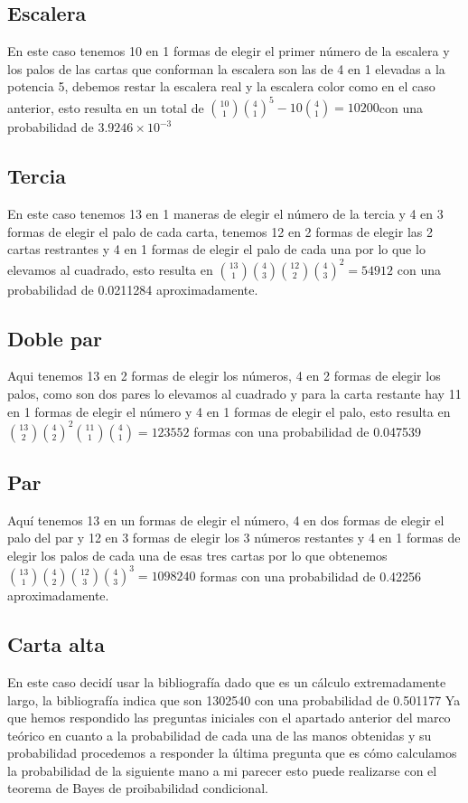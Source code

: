\documentclass[letterpaper,11pt,dvipsnames]{article}
\begin{document}
\subsection{Escalera}
En este caso tenemos 10 en 1 formas de elegir el primer número de la escalera y los palos de las cartas que conforman la escalera son las de 4 en 1 elevadas a la potencia 5, debemos restar la escalera real y la escalera color  como en el caso anterior, esto resulta en un total de \({{10}\choose{1}}{{4}\choose{1}}^{5}-10{{4}\choose{1}}=10200\)con una probabilidad de \(3.9246 \times 10^{-3}\)
\subsection{Tercia}
En este caso tenemos 13 en 1 maneras de elegir el número de la tercia y 4 en 3 formas de elegir el palo de cada carta, tenemos 12 en 2 formas de elegir las 2 cartas restrantes y 4 en 1 formas de elegir el palo de cada una por lo que lo elevamos al cuadrado, esto resulta en \({{13}\choose{1}}{{4}\choose{3}}{{12}\choose{2}}{{4}\choose{3}}^{2}=54912\) con una probabilidad de 0.0211284 aproximadamente.
\subsection{Doble par}
Aqui tenemos 13 en 2 formas de elegir los números, 4 en 2 formas de elegir los palos, como son dos pares lo elevamos al cuadrado y para la carta restante hay 11 en 1 formas de elegir el número y 4 en 1 formas de elegir el palo, esto resulta en \({{13}\choose{2}}{{4}\choose{2}}^{2}{{11}\choose{1}}{{4}\choose{1}}=123552\) formas con una probabilidad de 0.047539
\subsection{Par}
Aquí tenemos 13 en un formas de elegir el número, 4 en dos formas de elegir el palo del par y 12 en 3 formas de elegir los 3 números restantes y 4 en 1 formas de elegir los palos de cada una de esas tres cartas por lo que obtenemos \({{13}\choose{1}}{{4}\choose{2}}{{12}\choose{3}}{{4}\choose{3}}^{3}=1098240\) formas con una probabilidad de 0.42256  aproximadamente.
\subsection{Carta alta}
En este caso decidí usar la bibliografía dado que es un cálculo extremadamente largo, la bibliografía indica que son 1302540 con una probabilidad de 0.501177
Ya que hemos respondido las preguntas iniciales con el apartado anterior del marco teórico en cuanto a la probabilidad de cada una de las manos obtenidas y su probabilidad procedemos a responder la última pregunta que es cómo calculamos la probabilidad de la siguiente mano a mi parecer esto puede realizarse con el teorema de Bayes de proibabilidad condicional.
\end{document}

